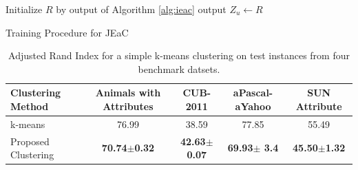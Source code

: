 \documentclass[10pt,twocolumn,letterpaper]{article}
\begin{document}
\begin{algorithm}[t]
  {\small
  \BlankLine
  Initialize $R$ by output of Algorithm \ref{alg:ieac} \;
  output $Z_u \leftarrow R$
 }
 \caption{Training Procedure for JEaC}
 \label{alg:jeac}
\end{algorithm}
\begin{table}[ht]
\centering
\caption{Adjusted Rand Index for  a simple k-means clustering on test instances from four benchmark datsets.
}  \label{tab:cluster}
\begin{tabular}{|l|c|c|c|c|}
\hline
Clustering Method & Animals with Attributes & CUB-2011 & aPascal-aYahoo & SUN Attribute \\
\hline
k-means                             &  76.99                 & 38.59           & 77.85                & 55.49    \\
\hline
Proposed Clustering                     & \textbf{70.74$\pm$0.32}  & \textbf{42.63$\pm$0.07} & \textbf{69.93$\pm$ 3.4} & \textbf{ 45.50$\pm$1.32} \\
\hline
\end{tabular}
\end{table}
\end{document}
